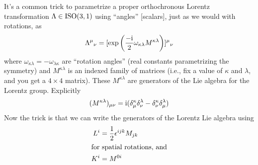 It's a common trick to parametrize a proper orthochronous Lorentz
transformation $\Lambda\in\mathrm{ISO}(3,1)$ using 
``angles'' [scalars], just as we would with rotations, as
\begin{equation}
{\Lambda^{\mu}}_{\nu} = [\exp\left(\frac{-\mathrm{i}}{2}\omega_{\kappa\lambda}M^{\kappa\lambda}\right)]{{}^{\mu}}_{\nu}
\end{equation}
where $\omega_{\kappa\lambda}=-\omega_{\lambda\kappa}$ are ``rotation
angles'' (real constants parametrizing the symmetry) and
$M^{\kappa\lambda}$ is an indexed family of matrices (i.e., fix a value
of $\kappa$ and $\lambda$, and you get a $4\times4$ matrix). These $M^{\kappa\lambda}$ are
generators of the Lie algebra for the Lorentz group. Explicitly
\begin{equation}
(M^{\kappa\lambda})_{\mu\nu} = \mathrm{i}(\delta^{\kappa}_{\mu}\delta^{\lambda}_{\nu}-\delta^{\kappa}_{\nu}\delta^{\lambda}_{\mu})
\end{equation}
Now the trick is that we can write the generators of the Lorentz Lie
algebra using
\begin{subequations}\label{eq:rqm:poincare-algebra:rotations-and-boosts-generators}
\begin{align}
L^{i} &= \frac{1}{2}\epsilon^{ijk}M_{jk}\\
\intertext{for spatial rotations, and}
K^{i} &= M^{0i}%
\end{align}
\end{subequations}

